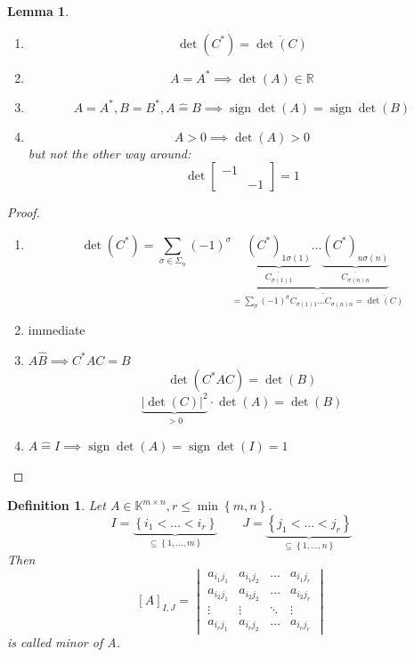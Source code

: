 \documentclass{article}
\newtheorem{definition}{Definition}  \numberwithin{definition}{section}
\newtheorem{lemma}{Lemma}  \numberwithin{lemma}{section}
\newcommand{\set}[1]{\left\{#1\right\}}
\newcommand{\card}[1]{\left|#1\right|}
\DeclareMathOperator{\sign}{sign}
\begin{document}
\begin{lemma}
  \begin{enumerate}
    \item \[ \det(C^*) = \overline{\det(C)} \]
    \item \[ A = A^* \implies \det(A) \in \mathbb R \]
    \item \[ A = A^*, B = B^*, A \hat= B \implies \sign{\det(A)} = \sign{\det(B)} \]
    \item \[ A > 0 \implies \det(A) > 0 \]
      but not the other way around:
      \[ \det\begin{bmatrix} -1 & \\ & -1 \end{bmatrix} = 1 \]
  \end{enumerate}
\end{lemma}

\begin{proof}
  \begin{enumerate}
    \item
      \[ \det(C^*) = \sum_{\sigma \in \Sigma_n} (-1)^\sigma \underbrace{\underbrace{(C^*)_{1 \sigma(1)}}_{\overline{C_{\sigma(1) 1}}} \ldots \underbrace{(C^*)_{n \sigma(n)}}_{\overline{C_{\sigma(n) n}}}}_{= \overline{\sum_{\sigma} (-1)^\sigma C_{\sigma(1) 1} \ldots C_{\sigma(n) n} = \overline{\det(C)} }} \]
    \item immediate
    \item $A \hat B \implies C^* AC = B$
      \[ \det(C^* AC) = \det(B) \]
      \[ \underbrace{\card{\det(C)}^2}_{>0} \cdot \det(A) = \det(B) \]
    \item $A \hat= I \implies \sign{\det(A)} = \sign{\det(I)} = 1$
  \end{enumerate}
\end{proof}

\begin{definition} %
  Let $A \in \mathbb K^{m \times n}, r \leq \min\set{m,n}$.
  \[ I = \underbrace{\set{i_1 < \ldots < i_r}}_{\subseteq \set{1, \ldots, m}} \qquad J = \underbrace{\set{j_1 < \ldots < j_r}}_{\subseteq \set{1, \ldots, n}} \]
  Then
  \[
    \left[A\right]_{I,J} =
    \begin{vmatrix}
      a_{i_1 j_1} & a_{i_1 j_2} & \ldots & a_{i_1 j_r} \\
      a_{i_2 j_1} & a_{i_2 j_2} & \ldots & a_{i_2 j_r} \\
      \vdots & \vdots & \ddots & \vdots \\
      a_{i_r j_1} & a_{i_r j_2} & \ldots & a_{i_r j_r}
    \end{vmatrix}
  \]
  is called \emph{minor of A}.
\end{definition}
\end{document}

